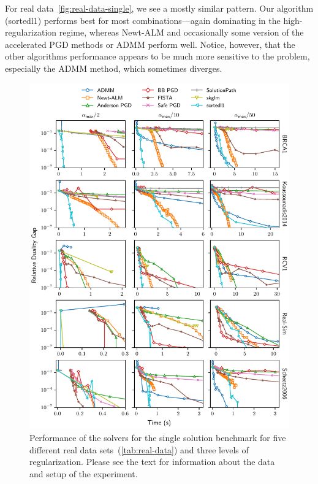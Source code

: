 \documentclass[article]{jss}
\makeatletter
\let\natwidth\Gin@nat@width
\makeatother
\begin{document}
For real data~\autoref{fig:real-data-single}, we see a mostly similar pattern.
Our algorithm (sortedl1) performs best for most combinations---again dominating
in the high-regularization regime, whereas Newt-ALM and occasionally some version of
the accelerated PGD methods or ADMM perform well. Notice, however, that the other algorithms
performance appears to be much more sensitive to the problem, especially the
ADMM method, which sometimes diverges.

\begin{figure}[tp]
  \centering
  \includegraphics[width=\natwidth]{images/benchmark_single_real.pdf}
  \caption{%
    Performance of the solvers for the single solution benchmark for five
    different real data sets~(\autoref{tab:real-data}) and three levels of
    regularization. Please see the text for information about the data and
    setup of the experiment.
  }
  \label{fig:real-data-single}
\end{figure}
\end{document}
